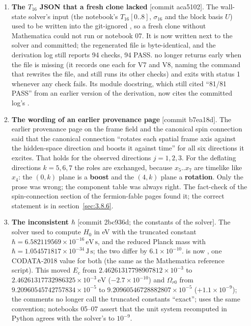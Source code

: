 \begin{enumerate}
The tests went from 21 + 8 to 34/34 (23 unit + 11 integration), and the scipy cross-check still passes (largest difference $1.1\times10^{-8}$).
  \item \textbf{The $T_{16}$ JSON that a fresh clone lacked} [commit aca5102]. The wall-state solver's input  (the notebook's $T_{16}[0..8]$, $\sigma_{16}$ and the block basis $U$) used to be written into the git-ignored , so a fresh clone without Mathematica could not run  or notebook 07. It is now written next to the solver and committed; the regenerated file is byte-identical, and the derivation log still reports 94 checks, 94 PASS.  no longer returns early when the file is missing (it records one  each for V7 and V8, naming the command that rewrites the file, and still runs its other checks) and exits with status 1 whenever any check fails. Its module docstring, which still cited ``81/81 PASS'' from an earlier version of the derivation, now cites the committed log's .
  \item \textbf{The wording of an earlier provenance page} [commit b7ea18d]. The earlier provenance page on the frame field and the canonical spin connection said that the canonical connection ``rotates each spatial frame axis against the hidden-space direction and boosts it against time'' for all six directions it excites. That holds for the observed directions $j = 1, 2, 3$. For the deflating directions $k = 5, 6, 7$ the roles are exchanged, because $x_5..x_7$ are timelike like $x_{4}$: the $(0,k)$ plane is a \textbf{boost} and the $(4,k)$ plane a \textbf{rotation}. Only the prose was wrong; the component table was always right. The fact-check of the spin-connection section of the fermion-fable pages found it; the correct statement is in section~\ref{sec:3.8.6}.
  \item \textbf{The inconsistent $\hbar$} [commit 2bc936d; the constants of the solver]. The solver used to compute $H_0$ in eV with the truncated constant $\hbar=6.582119569\times10^{-16}\,\mathrm{eV\,s}$, and the reduced Planck mass with $\hbar=1.054571817\times10^{-34}\,\mathrm{J\,s}$; the two differ by $6.1\times10^{-10}$.  is now , one CODATA-2018 value for both (the same as the Mathematica reference script). This moved $E_c$ from $2.46261317798907812\times10^{-3}$ to $2.46261317732986325\times10^{-3}\,\mathrm{eV}$ ($-2.7\times10^{-10}$) and $\Omega_{r0}$ from $9.20960545742757834\times10^{-5}$ to $9.20960546728882807\times10^{-5}$ ($+1.1\times10^{-9}$); the comments no longer call the truncated constants ``exact'';  uses the same convention; notebooks 05--07 assert that the unit system recomputed in Python agrees with the solver's to $10^{-9}$.

\end{enumerate}
